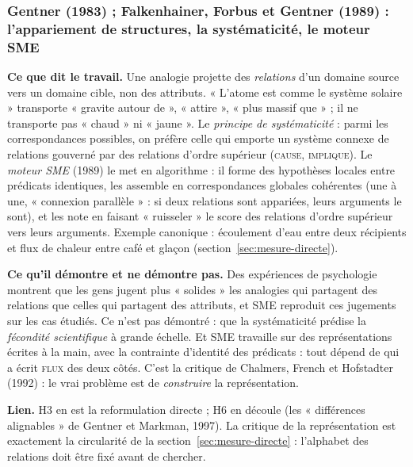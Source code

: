 \documentclass[a4paper,11pt]{article}
\newcommand{\cours}[1]{\par\smallskip\textbf{\textsf{#1}}\enspace}
\begin{document}
\subsubsection{Gentner (1983) ; Falkenhainer, Forbus et Gentner (1989) : l'appariement de structures, la systématicité, le moteur SME}
\cours{Ce que dit le travail.} Une analogie projette des \emph{relations} d'un domaine source vers un domaine cible, non des attributs. « L'atome est comme le système solaire » transporte « gravite autour de », « attire », « plus massif que » ; il ne transporte pas « chaud » ni « jaune ». Le \emph{principe de systématicité} : parmi les correspondances possibles, on préfère celle qui emporte un système connexe de relations gouverné par des relations d'ordre supérieur (\textsc{cause}, \textsc{implique}). Le \emph{moteur SME} (1989) le met en algorithme : il forme des hypothèses locales entre prédicats identiques, les assemble en correspondances globales cohérentes (une à une, « connexion parallèle » : si deux relations sont appariées, leurs arguments le sont), et les note en faisant « ruisseler » le score des relations d'ordre supérieur vers leurs arguments. Exemple canonique : écoulement d'eau entre deux récipients et flux de chaleur entre café et glaçon (section~\ref{sec:mesure-directe}).
\cours{Ce qu'il démontre et ne démontre pas.} Des expériences de psychologie montrent que les gens jugent plus « solides » les analogies qui partagent des relations que celles qui partagent des attributs, et SME reproduit ces jugements sur les cas étudiés. Ce n'est pas démontré : que la systématicité prédise la \emph{fécondité scientifique} à grande échelle. Et SME travaille sur des représentations écrites à la main, avec la contrainte d'identité des prédicats : tout dépend de qui a écrit \textsc{flux} des deux côtés. C'est la critique de Chalmers, French et Hofstadter (1992) : le vrai problème est de \emph{construire} la représentation.
\cours{Lien.} H3 en est la reformulation directe ; H6 en découle (les « différences alignables » de Gentner et Markman, 1997). La critique de la représentation est exactement la circularité de la section~\ref{sec:mesure-directe} : l'alphabet des relations doit être fixé avant de chercher.
\end{document}

